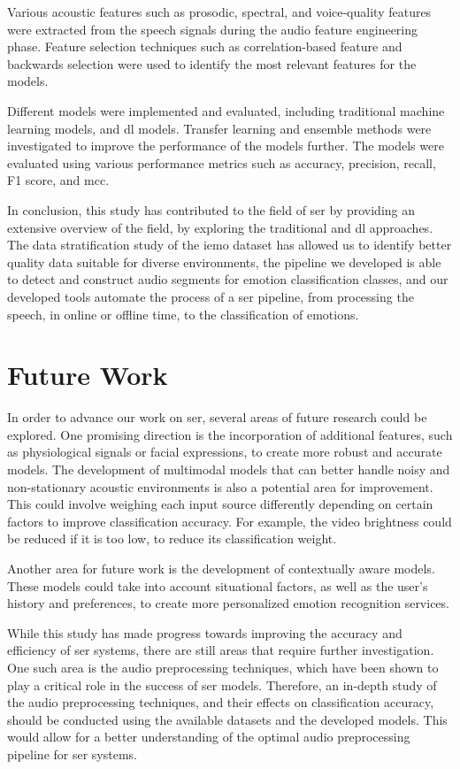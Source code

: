 Various acoustic features such as prosodic, spectral, and voice-quality features were extracted from the speech signals during the audio feature engineering phase. Feature selection techniques such as correlation-based feature and backwards selection were used to identify the most relevant features for the models.

Different models were implemented and evaluated, including traditional machine learning models, and \ac{dl} models. Transfer learning and ensemble methods were investigated to improve the performance of the models further. The models were evaluated using various performance metrics such as accuracy, precision, recall, F1 score, and \ac{mcc}.

In conclusion, this study has contributed to the field of \ac{ser} by providing an extensive overview of the field, by exploring the traditional and \ac{dl} approaches. The data stratification study of the \ac{iemo} dataset has allowed us to identify better quality data suitable for diverse environments, the pipeline we developed is able to detect and construct audio segments for emotion classification classes, and our developed tools automate the process of a \ac{ser} pipeline, from processing the speech, in online or offline time, to the classification of emotions.


\section{Future Work}

In order to advance our work on \ac{ser}, several areas of future research could be explored. One promising direction is the incorporation of additional features, such as physiological signals or facial expressions, to create more robust and accurate models. The development of multimodal models that can better handle noisy and non-stationary acoustic environments is also a potential area for improvement. This could involve weighing each input source differently depending on certain factors to improve classification accuracy. For example, the video brightness could be reduced if it is too low, to reduce its classification weight.

Another area for future work is the development of contextually aware models. These models could take into account situational factors, as well as the user's history and preferences, to create more personalized emotion recognition services.

While this study has made progress towards improving the accuracy and efficiency of \ac{ser} systems, there are still areas that require further investigation. One such area is the audio preprocessing techniques, which have been shown to play a critical role in the success of \ac{ser} models. Therefore, an in-depth study of the audio preprocessing techniques, and their effects on classification accuracy, should be conducted using the available datasets and the developed models. This would allow for a better understanding of the optimal audio preprocessing pipeline for \ac{ser} systems.

